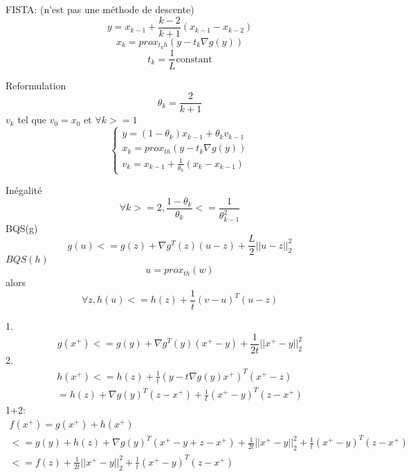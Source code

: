\documentclass{article}
\begin{document}
FISTA:
(n'est pas une m\'ethode de descente)
\begin{equation}
y = x_{k-1}+\frac{k-2}{k+1}(x_{k-1}-x_{k-2})
\end{equation}
\begin{equation}
x_k=prox_{t_k h}(y-t_k\nabla g(y))
\end{equation}
\begin{equation}
t_k=\frac{1}{L} \text{constant}
\end{equation}

Reformulation
\begin{equation}
\theta_k=\frac{2}{k+1}
\end{equation}
$v_k$ tel que $v_0=x_0$ et $\forall k>=1$
\begin{equation}
\left\{
\begin{array}{l}
y=(1-\theta_k)x_{k-1}+\theta_k v_{k-1}\\
x_k=prox_{th} (y-t_k\nabla g(y))\\
v_k=x_{k-1}+\frac{1}{\theta_k}(x_k-x_{k-1})
\end{array}\right.
\end{equation}

In\'egalit\'e
\begin{equation}
\forall k>=2,\frac{1-\theta_k}{\theta_k}<=\frac{1}{\theta^2_{k-1}}
\end{equation}
BQS(g)
\begin{equation}
g(u)<=g(z)+\nabla g^T(z)(u-z)+\frac{L}{2}||u-z||^2_2
\end{equation}
$BQS(h)$
\begin{equation}
u=prox_{th}(w)
\end{equation}
alors
\begin{equation}
\forall z, h(u)<=h(z)+\frac{1}{t}(v-u)^T(u-z)
\end{equation}

1.
\begin{equation}
g(x^+)<=g(y)+\nabla g^T(y)(x^+-y)+\frac{1}{2t}||x^+-y||^2_2
\end{equation}
2.
\begin{equation}
\begin{split}
h(x^+)<=h(z)+\frac{1}{t}(y-t\nabla g(y)x^+)^T(x^+-z)\\
=h(z)+\nabla g(y)^T(z-x^+)+\frac{1}{t}(x^+-y)^T(z-x^+)
\end{split}
\end{equation}
1+2:
\begin{equation}
\begin{split}
f(x^+)=g(x^+)+h(x^+)\\
<=g(y)+h(z)+\nabla g(y)^T (x^+-y+z-x^+)+\frac{1}{2t}||x^+-y||_2^2+\frac{1}{t}(x^+-y)^T(z-x^+)\\
<=f(z)+\frac{1}{2t}||x^+-y||_2^2+\frac{1}{t}(x^+-y)^T(z-x^+)
\end{split}
\end{equation}
\end{document}
